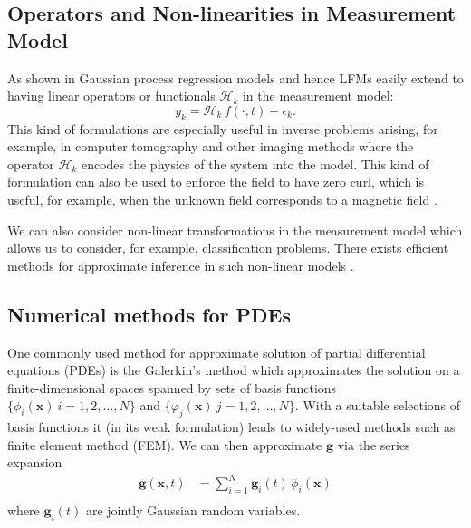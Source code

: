 \documentclass[journal]{IEEEtran}
\begin{document}
\subsection{Operators and Non-linearities in Measurement Model}

As shown in \cite{Sarkka:2011,Sarkka+Hartikainen:2012,Sarkka+Solin+Hartikainen:2013} Gaussian process regression models and hence LFMs easily extend to having linear operators or functionals $\mathcal{H}_k$ in the measurement model:
%
\begin{equation}
  y_k = \mathcal{H}_k \, f(\cdot,t) + \epsilon_k.
\end{equation}
%
This kind of formulations are especially useful in inverse problems \cite{Kaipio+Somersalo:2005} arising, for example, in computer tomography and other imaging methods where the operator $\mathcal{H}_k$ encodes the physics of the system into the model. This kind of formulation can also be used to enforce the field to have zero curl, which is useful, for example, when the unknown field corresponds to a magnetic field \cite{Solin:2017}.

We can also consider non-linear transformations in the measurement model which allows us to consider, for example, classification problems. There exists efficient methods for approximate inference in such non-linear models \cite{Rasmussen+Williams:2006,Sarkka:2013}.

\subsection{Numerical methods for PDEs}

One commonly used method for approximate solution of partial differential equations (PDEs) is the Galerkin's method which approximates the solution on a finite-dimensional spaces spanned by sets of basis functions $\{ \phi_i(\mathbf{x})~i=1,2,\ldots,N \}$ and $\{ \varphi_j(\mathbf{x})~j=1,2,\ldots,N \}$. With a suitable selections of basis functions it (in its weak formulation) leads to widely-used methods such as finite element method (FEM). We can then approximate $\mathbf{g}$ via the series expansion
%
\begin{equation}
\begin{split}
   \mathbf{g}(\mathbf{x},t) &= \sum_{i=1}^N \mathbf{g}_i(t) \, \phi_i(\mathbf{x}) \\
\end{split}
\end{equation}
%
where $\mathbf{g}_i(t)$ are jointly Gaussian random variables.
\end{document}
